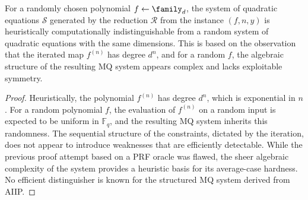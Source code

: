             \begin{lemma}\label{lemma:heuristic-average-mq}
                For a randomly chosen polynomial $f \leftarrow \family_d$, the system of quadratic equations $\mathcal{S}$ generated by the reduction $\mathcal{R}$ from the instance $(f, n, y)$ is heuristically computationally indistinguishable from a random system of quadratic equations with the same dimensions. This is based on the observation that the iterated map $f^{(n)}$ has degree $d^n$, and for a random $f$, the algebraic structure of the resulting MQ system appears complex and lacks exploitable symmetry.
            \end{lemma}
            \begin{proof}
                Heuristically, the polynomial $f^{(n)}$ has degree $d^n$, which is exponential in $n$. For a random polynomial $f$, the evaluation of $f^{(n)}$ on a random input is expected to be uniform in $\mathbb{F}_q$, and the resulting MQ system inherits this randomness. The sequential structure of the constraints, dictated by the iteration, does not appear to introduce weaknesses that are efficiently detectable. While the previous proof attempt based on a PRF oracle was flawed, the sheer algebraic complexity of the system provides a heuristic basis for its average-case hardness. No efficient distinguisher is known for the structured MQ system derived from AIIP.
            \end{proof}

